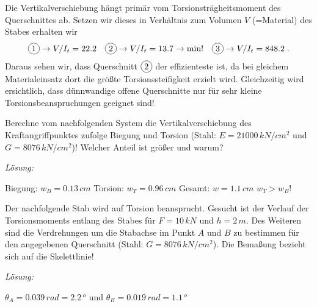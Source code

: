 \begin{example}
	Die Vertikalverschiebung hängt primär vom Torsionsträgheitsmoment des Querschnittes ab.
	Setzen wir dieses in Verhältnis zum Volumen $V$ (=Material) des Stabes erhalten wir
	\[
	\circled{1}\rightarrow V/I_t = 22.2 \quad \circled{2}\rightarrow V/I_t = 13.7\rightarrow\text{min!}  \quad \circled{3}\rightarrow V/I_t = 848.2 \; .
	\]
	Daraus sehen wir, dass  Querschnitt $\circled{2}$ der effizienteste ist, da bei gleichem Materialeinsatz dort die größte Torsionssteifigkeit erzielt wird.
	Gleichzeitig wird ersichtlich, dass dünnwandige offene Querschnitte nur für sehr kleine Torsionsbeanspruchungen geeignet sind!
\end{example}

\begin{example}
	Berechne vom nachfolgenden System die Vertikalverschiebung des Kraftangriffpunktes zufolge Biegung und Torsion (Stahl: $E=21000\,\unit{kN/cm^2}$ und $G=8076\,\unit{kN/cm^2}$)!
	Welcher Anteil ist größer und warum?
	\begin{center}
		
	\end{center}
	
	\textit{Lösung:}
	
	Biegung: $w_B = 0.13\,\unit{cm}$ \hspace{4mm} Torsion: $w_T = 0.96\,\unit{cm}$ \hspace{4mm} Gesamt: $w = 1.1\,\unit{cm}$  \hspace{4mm} $w_T>w_B!$
	
\end{example}

\begin{example}
	Der nachfolgende Stab wird auf Torsion beansprucht.
	Gesucht ist der Verlauf der Torsionsmoments entlang des Stabes für $F=10\,\unit{kN}$ und $h=2\,\unit{m}$.
	Des Weiteren sind die Verdrehungen um die Stabachse im Punkt $A$ und $B$ zu bestimmen für den angegebenen Querschnitt (Stahl: $G=8076\,\unit{kN/cm^2}$).
	Die Bemaßung bezieht sich auf die Skelettlinie!
	\begin{center}
		
	\end{center}
	
	\textit{Lösung:}
	
	$\theta_A = 0.039\,\unit{rad} = 2.2\,\unit{^o}$ und $\theta_B = 0.019\,\unit{rad} = 1.1\,\unit{^o}$	
\end{example}


